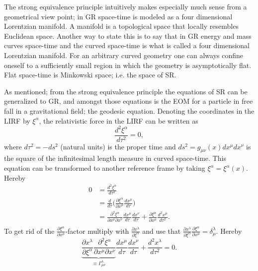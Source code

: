 The strong equivalence principle intuitively makes especially much sense from a geometrical view point; in GR space-time is modeled as a four dimensional Lorentzian manifold. A manifold is a topological space that locally resembles Euclidean space. Another way to state this is to say that in GR energy and mass curves space-time and the curved space-time is what is called a four dimensional Lorentzian manifold. For an arbitrary curved geometry one can always confine oneself to a sufficiently small region in which the geometry is asymptotically flat. Flat space-time is Minkowski space; i.e. the space of SR. 

As mentioned; from the strong equivalence principle the equations of SR can be generalized to GR, and amongst those equations is the EOM for a particle in free fall in a gravitational field; the geodesic equation. Denoting the coordinates in the LIRF by $\xi^\alpha$, the relativistic force in the LIRF can be written as
\begin{equation}
	\frac{d^2\xi^\alpha}{d\tau^2}=0,
\end{equation} 
where $d\tau^2=-ds^2$ (natural units) is the proper time and $ds^2=g_{\mu\nu}(x)dx^\mu dx^\nu$ is the square of the infinitesimal length measure in curved space-time. This equation can be transformed to another reference frame by taking $\xi^\alpha=\xi^\alpha(x)$. Hereby
\begin{equation}
	\begin{split}
		0&=\frac{d^2\xi^\alpha}{d\tau^2}\\
		&=\frac{d}{d\tau}\bigg(\frac{\partial\xi^\alpha}{\partial x^\mu}\frac{dx^\mu}{d\tau}\bigg)\\
		&=\frac{\partial^2\xi^\alpha}{\partial x^\mu  \partial x^\nu}\frac{dx^\mu}{d\tau}\frac{dx^\nu}{d\tau}+\frac{\partial\xi^\alpha}{\partial x^\mu}\frac{d^2x^\mu}{d\tau^2}.\\
	\end{split}
\end{equation} 
To get rid of the $\frac{\partial\xi^\alpha}{\partial x^\mu}$-factor multiply with $\frac{\partial x^\lambda}{\partial \xi^\alpha}$ and use that $\frac{\partial x^\lambda}{\partial \xi^\alpha}\frac{\partial \xi^\alpha}{\partial x^\mu}=\delta^\lambda_\mu$. Hereby
\begin{equation}
	\underbrace{\frac{\partial x^\lambda}{\partial \xi^\alpha}\frac{\partial^2\xi^\alpha}{\partial x^\mu  \partial x^\nu}}_{\equiv \Gamma^\lambda_{\mu\nu}}\frac{dx^\mu}{d\tau}\frac{dx^\nu}{d\tau}+\frac{d^2x^\lambda}{d\tau^2}=0.
	\label{geo}
\end{equation} 
